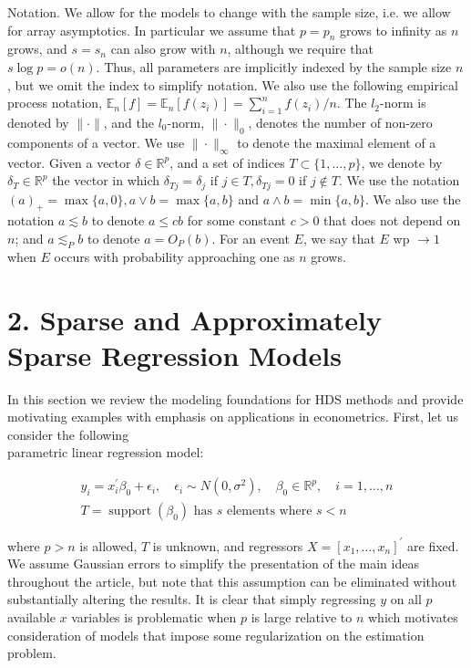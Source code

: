 \documentclass[10pt]{article}
\begin{document}
Notation. We allow for the models to change with the sample size, i.e. we allow for array asymptotics. In particular we assume that \(p=p_{n}\) grows to infinity as \(n\) grows, and \(s=s_{n}\) can also grow with \(n\), although we require that \(s \log p=o(n)\). Thus, all parameters are implicitly indexed by the sample size \(n\), but we omit the index to simplify notation. We also use the following empirical process notation, \(\mathbb{E}_{n}[f]=\mathbb{E}_{n}\left[f\left(z_{i}\right)\right]=\sum_{i=1}^{n} f\left(z_{i}\right) / n\). The \(l_{2}\)-norm is denoted by \(\|\cdot\|\), and the \(l_{0}\)-norm, \(\|\cdot\|_{0}\), denotes the number of non-zero components of a vector. We use \(\|\cdot\|_{\infty}\) to denote the maximal element of a vector. Given a vector \(\delta \in \mathbb{R}^{p}\), and a set of indices \(T \subset\{1, \ldots, p\}\), we denote by \(\delta_{T} \in \mathbb{R}^{p}\) the vector in which \(\delta_{T j}=\delta_{j}\) if \(j \in T, \delta_{T j}=0\) if \(j \notin T\). We use the notation \((a)_{+}=\max \{a, 0\}, a \vee b=\max \{a, b\}\) and \(a \wedge b=\min \{a, b\}\). We also use the notation \(a \lesssim b\) to denote \(a \leqslant c b\) for some constant \(c>0\) that does not depend on \(n\); and \(a \lesssim_{P} b\) to denote \(a=O_{P}(b)\). For an event \(E\), we say that \(E\) wp \(\rightarrow 1\) when \(E\) occurs with probability approaching one as \(n\) grows.

\section*{2. Sparse and Approximately Sparse Regression Models}
In this section we review the modeling foundations for HDS methods and provide motivating examples with emphasis on applications in econometrics. First, let us consider the following\\
parametric linear regression model:

\[
\begin{gathered}
y_{i}=x_{i}^{\prime} \beta_{0}+\epsilon_{i}, \quad \epsilon_{i} \sim N\left(0, \sigma^{2}\right), \quad \beta_{0} \in \mathbb{R}^{p}, \quad i=1, \ldots, n \\
T=\operatorname{support}\left(\beta_{0}\right) \text { has } s \text { elements where } s<n
\end{gathered}
\]

where \(p>n\) is allowed, \(T\) is unknown, and regressors \(X=\left[x_{1}, \ldots, x_{n}\right]^{\prime}\) are fixed. We assume Gaussian errors to simplify the presentation of the main ideas throughout the article, but note that this assumption can be eliminated without substantially altering the results. It is clear that simply regressing \(y\) on all \(p\) available \(x\) variables is problematic when \(p\) is large relative to \(n\) which motivates consideration of models that impose some regularization on the estimation problem.
\end{document}
